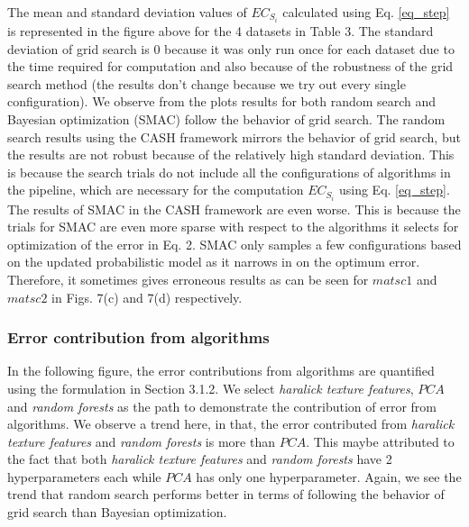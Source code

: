 The mean and standard deviation values of $EC_{S_i}$ calculated using Eq. \ref{eq_step} is represented in the figure above for the 4 datasets in Table 3. The standard deviation of grid search is 0 because it was only run once for each dataset due to the time required for computation and also because of the robustness of the grid search method (the results don't change because we try out every single configuration). We observe from the plots results for both random search and Bayesian optimization (SMAC) follow the behavior of grid search. The random search results using the CASH framework mirrors the behavior of grid search, but the results are not robust because of the relatively high standard deviation. This is because the search trials do not include all the configurations of algorithms in the pipeline, which are necessary for the computation $EC_{S_i}$ using Eq. \ref{eq_step}. The results of SMAC in the CASH framework are even worse. This is because the trials for SMAC are even more sparse with respect to the algorithms it selects for optimization of  the error in Eq. 2. SMAC only samples a few configurations based on the updated probabilistic model as it narrows in on the optimum error. Therefore, it sometimes gives erroneous results as can be seen for $matsc1$ and $matsc2$ in Figs. 7(c) and 7(d) respectively.


\subsubsection{Error contribution from algorithms}

In the following figure, the error contributions from algorithms are quantified using the formulation in Section 3.1.2. We select \textit{haralick texture features}, $PCA$ and \textit{random forests} as the path to demonstrate the contribution of error from algorithms. We observe a trend here, in that, the error contributed from \textit{haralick texture features} and \textit{random forests} is more than $PCA$. This maybe attributed to the fact that both \textit{haralick texture features} and \textit{random forests} have 2 hyperparameters each while $PCA$ has only one hyperparameter. Again, we see the trend that random search performs better in terms of following the behavior of grid search than Bayesian optimization.

